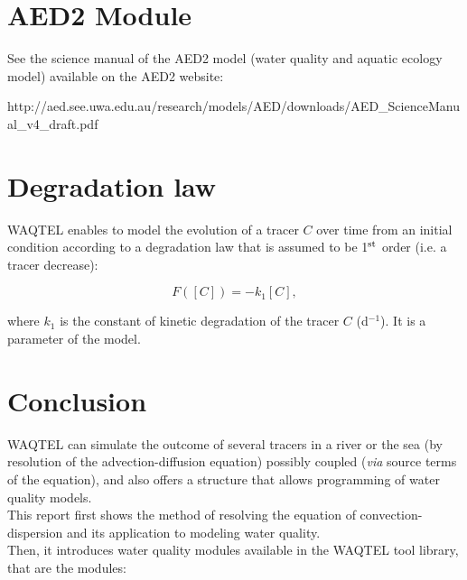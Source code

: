 \documentclass[Waqtel]{../../data/TelemacDoc} %
\begin{document}
\newpage














\chapter{AED2 Module}

See the science manual of the AED2 model (water quality and aquatic ecology model)
available on the AED2 website:

http://aed.see.uwa.edu.au/research/models/AED/downloads/AED\_ScienceManual\_v4\_draft.pdf


\chapter{Degradation law}

WAQTEL enables to model the evolution of a tracer $C$ over time from an initial condition
according to a degradation law that is assumed to be 1$^{\rm{st}}$ order (i.e. a tracer decrease):

\begin{equation}
  F([C]) = -k_1 [C],
\end{equation}

where $k_1$ is the constant of kinetic degradation of the tracer $C$ (d$^{-1}$).
It is a parameter of the model.


\chapter{Conclusion}

WAQTEL can simulate the outcome of several tracers in a river or the sea
(by resolution of the advection-diffusion equation) possibly coupled
(\textit{via} source terms of the equation),
and also offers a structure that allows programming of water quality models.\\

This report first shows the method of resolving the equation of convection-dispersion
 and its application to modeling water quality.\\

Then, it introduces water quality modules available in the WAQTEL tool library,
that are the modules:
\end{document}
